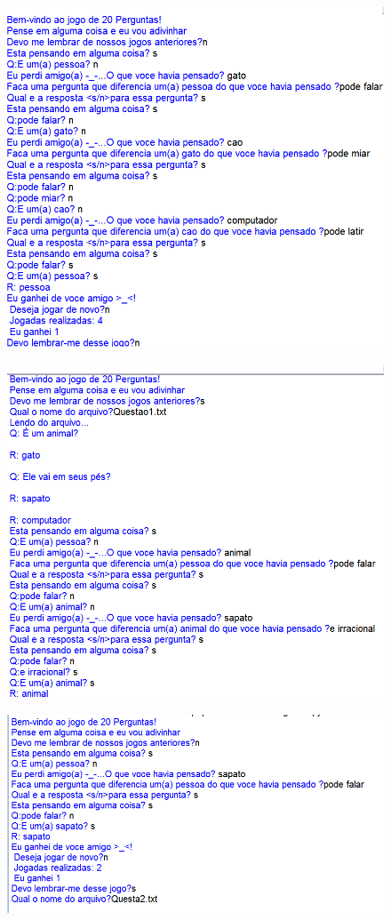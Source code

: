 \documentclass[12pt]{article}
\begin{document}
	\begin{figure}[ht]
		\centering
		\includegraphics[width=.5\textwidth]{fig1.png}
		\caption{
		}
	\end{figure}
	\begin{figure}[ht]
		\centering
		\includegraphics[width=.5\textwidth]{fig2.png}
		\caption{
		}
	\end{figure}
	\begin{figure}[ht]
		\centering
		\includegraphics[width=.5\textwidth]{fig3.png}
		\caption{
		}
	\end{figure}
	
	
	
	\newpage
\end{document}
